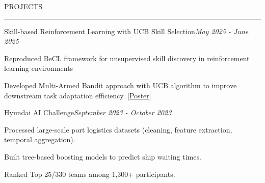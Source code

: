 \documentclass{resume} %
\renewenvironment{rSection}[1]{
\vspace{-0.5 em} %
\sectionskip
\textcolor{RoyalPurple}{\MakeUppercase{#1}}
\sectionlineskip
\hrule
\begin{list}{}{
\setlength{\leftmargin}{1.5em}
}
\item[]
}{
\end{list}
}
\begin{document}

\begin{rSection}{Projects}



\begin{rSubsection}{Skill-based Reinforcement Learning with UCB Skill Selection}{\em May 2025 - June 2025}{}{}
\vspace{-0.3 em}
\item Reproduced BeCL framework for unsupervised skill discovery in reinforcement learning environments 
\item Developed Multi-Armed Bandit approach with UCB algorithm to improve downstream task adaptation efficiency. \href{https://drive.google.com/file/d/1ftnfeFjGkvR5KkunbfXWZwIEhw3YWPVk/view?usp=sharing}{[Poster]}
\end{rSubsection}


\vspace{-0.75 em}
\begin{rSubsection}{Hyundai AI Challenge}{\em September 2023 - October 2023}{}{}
\vspace{-0.3 em}
\item Processed large-scale port logistics datasets (cleaning, feature extraction, temporal aggregation).
\item Built tree-based boosting models to predict ship waiting times.
\item Ranked Top 25/330 teams among 1,300+ participants.

\end{rSubsection}

\end{rSection}
\end{document}
